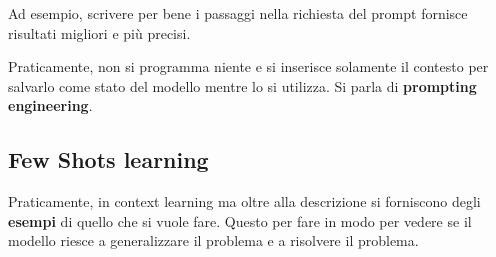 Ad esempio, scrivere per bene i passaggi nella richiesta del prompt fornisce risultati migliori e più precisi. 

Praticamente, non si programma niente e si inserisce solamente il contesto per salvarlo come stato del modello mentre lo si utilizza.
Si parla di \textbf{prompting engineering}.

\subsection{Few Shots learning}

Praticamente, in context learning ma oltre alla descrizione si forniscono degli \textbf{esempi} di quello che si vuole fare.
Questo per fare in modo per vedere se il modello riesce a generalizzare il problema e a risolvere il problema.
\newpage